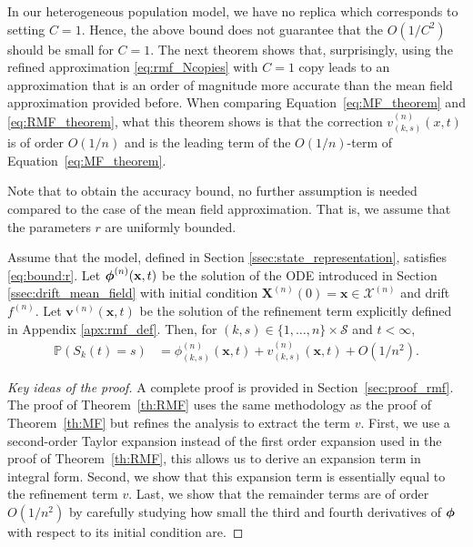 \documentclass[acmsmall]{acmart}
\newcommand\bx{\mathbf{x}}
\newcommand\bX{\mathbf{X}}
\newcommand\bv{\mathbf{v}}
\newcommand\bphi{\text{\boldmath$\phi$}}
\newcommand\calX{\mathcal{X}}
\newcommand\calS{\mathcal{S}}
\newcommand\toN{^{(n)}}
\newcommand\Proba[1]{\mathbb{P}\left(#1\right)} %
\begin{document}
In our heterogeneous population model, we have no replica which corresponds to setting $C=1$. Hence, the above bound does not guarantee that the $O(1/C^2)$ should be small for $C=1$. The next theorem shows that, surprisingly, using the refined approximation \eqref{eq:rmf_Ncopies} with $C=1$ copy leads to an approximation that is an order of magnitude more accurate than the mean field approximation provided before. When comparing Equation~\eqref{eq:MF_theorem} and \eqref{eq:RMF_theorem}, what this theorem shows is that the correction $v\toN_{(k,s)}(x,t)$ is of order $O(1/n)$ and is the leading term of the $O(1/n)$-term of Equation~\eqref{eq:MF_theorem}. 

Note that to obtain the accuracy bound, no further assumption is needed compared to the case of the mean field approximation. That is, we assume that the parameters $r$ are uniformly bounded.
\begin{theorem}
  \label{th:RMF}
  Assume that the model, defined in Section \ref{ssec:state_representation}, satisfies \eqref{eq:bound:r}. Let $\bphi\toN(\bx, t)$ be the solution of the ODE introduced in Section \ref{ssec:drift_mean_field} with initial condition $\bX\toN(0) = \bx \in \calX\toN$ and drift $f\toN$. Let $\bv\toN(\bx, t)$ be the solution of the refinement term explicitly defined in Appendix \ref{apx:rmf_def}. Then, for $(k,s)\in \{1,\ldots,n\}\times \calS$ and $t < \infty$,
  \begin{align}
    \label{eq:RMF_theorem}
    \Proba{S_k(t)=s } & = \phi\toN_{(k,s)}(\bx,t) + v\toN_{(k,s)}(\bx,t) + O(1/n^2).
  \end{align}
\end{theorem}
\color{black}
\begin{proof}[Key ideas of the proof]
  A complete proof is provided in Section~\ref{sec:proof_rmf}. The proof of Theorem~\ref{th:RMF} uses the same methodology as the proof of Theorem~\ref{th:MF} but refines the analysis to extract the term $v$. First, we use a second-order Taylor expansion instead of the first order expansion used in the proof of Theorem~\ref{th:RMF}, this allows us to derive an expansion term in integral form. Second, we show that this expansion term is essentially equal to the refinement term $v$. Last, we show that the remainder terms are of order $O(1/n^2)$ by carefully studying how small the third and fourth derivatives of $\bphi$ with respect to its initial condition are.
\end{proof}
\end{document}
